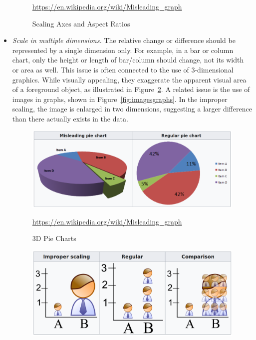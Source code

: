 \begin{itemize}
\begin{figure}
\scriptsize\url{https://en.wikipedia.org/wiki/Misleading_graph}
\caption{Scaling Axes and Aspect Ratios}
\label{fig:aspectratios}
\end{figure}
	\item \emph{Scale in multiple dimensions.} The relative change or difference should be represented by a single dimension only. For example, in a bar or column chart, only the height or length of bar/column should change, not its width or area as well. This issue is often connected to the use of 3-dimensional graphics. While visually appealing, they exaggerate the apparent visual area of a foreground object, as illustrated in Figure~\ref{fig:3dpie}. A related issue is the use of images in graphs, shown in Figure~\ref{fig:imagesgraphs}. In the improper scaling, the image is enlarged in two dimensions, suggesting a larger difference than there actually exists in the data.
\begin{figure}
\centering
\includegraphics[width=.8\textwidth]{screen6.png}

\scriptsize\url{https://en.wikipedia.org/wiki/Misleading_graph}
\caption{3D Pie Charts}
\label{fig:3dpie}
\end{figure}
\begin{figure}
\centering
\includegraphics[width=.75\textwidth]{screen1.png}


\end{figure}
\end{itemize}
